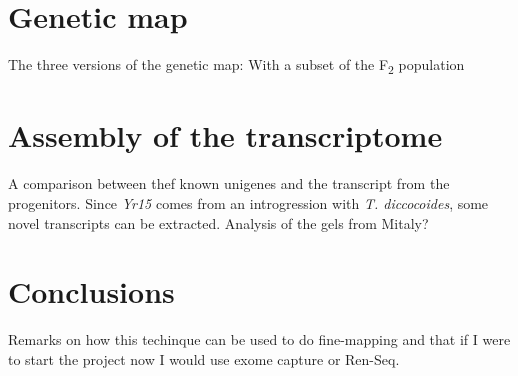 \section{Genetic map} 
The three versions of the genetic map: With a subset of the F\textsubscript{2} population

\section{Assembly of the transcriptome} 
A comparison between thef known unigenes and the transcript from the progenitors. Since \textit{Yr15} comes from an introgression with \textit{T. diccocoides}, some novel transcripts can be extracted. Analysis of the gels from Mitaly? 

\section{Conclusions} 
Remarks on how this techinque can be used to do fine-mapping and that if I were to start the project now I would  use exome capture or Ren-Seq. 